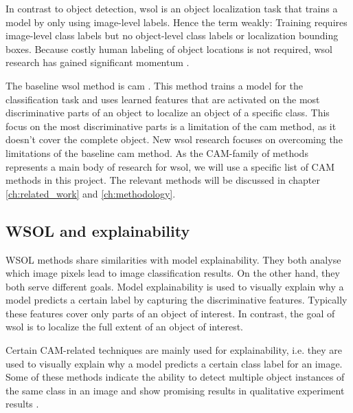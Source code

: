 In contrast to object detection, \acrshort{wsol} is an object localization task that trains a model by only using image-level labels. Hence the term weakly: Training requires image-level class labels but no object-level class labels or localization bounding boxes. Because costly human labeling of object locations is not required, \acrshort{wsol} research has gained significant momentum \cite{zhou2016cvpr, selvaraju2017grad, chattopadhay2018grad, wang2021minmaxcam, wang2020score, choe2020evaluating}.

The baseline \acrshort{wsol} method is \acrfull{cam} \cite{zhou2016cvpr}. This method trains a model for the classification task and uses learned features that are activated on the most discriminative parts of an object to localize an object of a specific class. This focus on the most discriminative parts is a limitation of the \acrshort{cam} method, as it doesn't cover the complete object. New \acrshort{wsol} research \cite{selvaraju2017grad, chattopadhay2018grad, wang2021minmaxcam, wang2020score, choe2020evaluating} focuses on overcoming the limitations of the baseline \acrshort{cam} method. As the CAM-family of methods represents a main body of research for \acrlong{wsol}, we will use a specific list of CAM methods in this project. The relevant methods will be discussed in chapter \ref{ch:related_work} and \ref{ch:methodology}. 

\subsection{WSOL and explainability}
WSOL methods share similarities with model explainability. They both analyse which image pixels lead to image classification results. On the other hand, they both serve different goals.
Model explainability is used to visually explain why a model predicts a certain label by capturing the discriminative features. Typically these features cover only parts of an object of interest. In contrast, the goal of \acrshort{wsol} is to localize the full extent of an object of interest.

Certain CAM-related techniques are mainly used for explainability, i.e. they are used to visually explain why a model predicts a certain class label for an image. Some of these methods indicate the ability to detect multiple object instances of the same class in an image and show promising results in qualitative experiment results \cite{wang2020score}.

